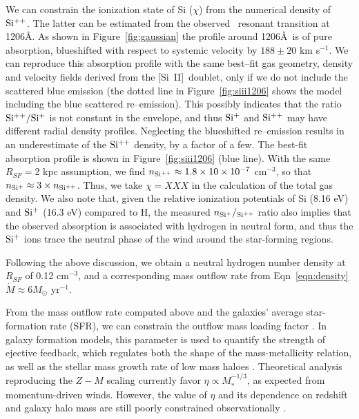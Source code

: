 \documentclass[manuscript]{emulateapj}
\newcommand{\siii}{[Si~{\small II}]}
\newcommand{\kms}{km s$^{-1}$}
\begin{document}
We can constrain the ionization state of Si ($\chi$) from the
numerical density of $\rm Si^{++}$. The latter can be estimated from
the observed \siiii\ resonant transition at 1206\AA. As shown in
Figure~\ref{fig:gaussian} the profile around 1206\AA\ is of pure
absorption, blueshifted with respect to systemic velocity by $188\pm
20$ \kms. We can reproduce this absorption profile with the same
best--fit gas geometry, density and velocity fields derived from the
\siii\ doublet, only if we do not include the scattered blue emission
(the dotted line in Figure~\ref{fig:siii1206} shows the model 
including the blue scattered re--emission). This possibly indicates
that the ratio $\rm Si^{++}/Si^{+}$ is not constant in the envelope,
and thus $\rm Si^+$ and $\rm Si^{++}$ may have different radial
density profiles. Neglecting the blueshifted re--emission results in
an underestimate of the $\rm Si^{++}$ density, by a factor of a
few. The best-fit absorption profile is shown in
Figure~\ref{fig:siii1206} (blue line). With the same $R_{SF}=2$ kpc
assumption, we find $n_{\rm Si^{++}}\approx 1.8 \times 10 \times
10^{-7}$ cm$^{-3}$, so that $n_{\rm Si^+}\approx 3 \times n_{\rm
  Si^{++}}$. Thus, we take $\chi = XXX$ in the calculation of the
total gas density. We also note that, given the relative ionization
potentials of Si (8.16 eV) and $\rm Si^+$ (16.3 eV) compared to H, the
measured $n_{\rm Si^+}/_{\rm Si^{++}}$ ratio also implies that the
observed absorption is associated with hydrogen in neutral form, and
thus the $\rm Si^+$ ions trace the neutral phase of the wind around
the star-forming regions.

Following the above discussion, we obtain a neutral hydrogen number
density at $R_{SF}$ of 0.12 cm$^{-3}$, and a corresponding mass
outflow rate from Eqn~\ref{eqn:density} $\dot{M} \approx 6 M_{\odot}$
yr$^{-1}$.

From the mass outflow rate computed above and the galaxies' average
star-formation rate (SFR), we can constrain the outflow mass loading
factor \citep[$\eta=\frac{\dot{M}}{SFR}$][]{dave2012}. In galaxy
formation models, this parameter is used to quantify the strength of
ejective feedback, which regulates both the shape of the
mass-metallicity relation, as well as the stellar mass growth rate of
low mass haloes \citep{dave2012,shen2012}. Theoretical analysis
reproducing the $Z-M$ scaling currently favor $\eta \propto
M_{*}^{-1/3}$, as expected from momentum-driven winds. However, the
value of $\eta$ and its dependence on redshift and galaxy halo mass
are still poorly constrained observationally
\citep[e.g.][]{martin2013}.
\end{document}
